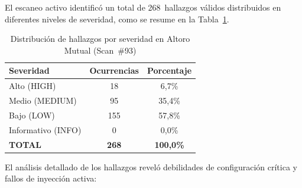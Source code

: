 \documentclass[12pt, a4paper]{article}
\begin{document}
El escaneo activo identificó un total de 268~hallazgos válidos distribuidos en diferentes
niveles de severidad, como se resume en la Tabla~\ref{tab:scan-altoro}.

\begin{table}[H]
    \centering
    \caption{Distribución de hallazgos por severidad en Altoro Mutual (Scan~\#93)}
    \label{tab:scan-altoro}
    \begin{tabular}{l c c}
        \toprule
        \textbf{Severidad} & \textbf{Ocurrencias} & \textbf{Porcentaje} \\
        \midrule
        Alto (HIGH)          & 18  & 6,7\% \\
        Medio (MEDIUM)       & 95  & 35,4\% \\
        Bajo (LOW)           & 155 & 57,8\% \\
        Informativo (INFO)   & 0   & 0,0\% \\
        \midrule
        \textbf{TOTAL}       & \textbf{268} & \textbf{100,0\%} \\
        \bottomrule
    \end{tabular}
\end{table}

El análisis detallado de los hallazgos reveló debilidades de configuración crítica
y fallos de inyección activa:
\end{document}
